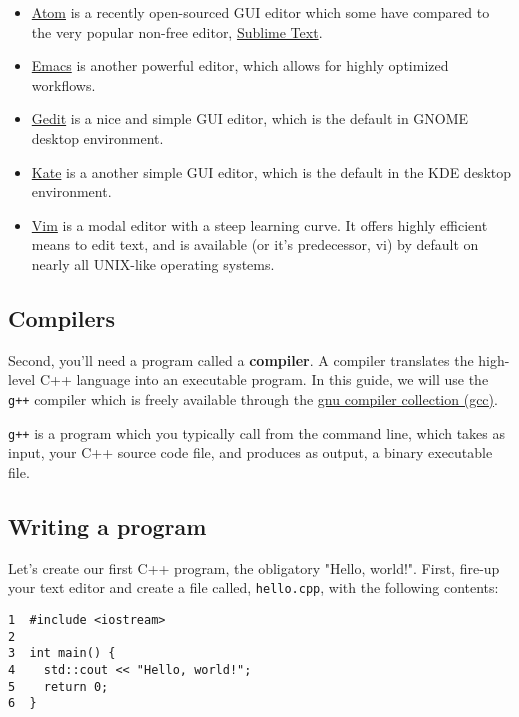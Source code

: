 \documentclass[11pt]{article}
\begin{document}
\begin{itemize}
\item \href{https://atom.io/}{Atom} is a recently open-sourced GUI editor which some have compared to the very popular non-free editor, \href{https://sublimetext.com}{Sublime Text}.
\item \href{https://www.gnu.org/software/emacs/}{Emacs} is another powerful editor, which allows for highly optimized workflows.
\item \href{https://wiki.gnome.org/Apps/Gedit}{Gedit} is a nice and simple GUI editor, which is the default in GNOME desktop environment.
\item \href{https://kate-editor.org}{Kate} is a another simple GUI editor, which is the default in the KDE desktop environment.
\item \href{http://www.vim.org}{Vim} is a modal editor with a steep learning curve. It offers highly efficient means to edit text, and is available (or it's predecessor, vi) by default on nearly all UNIX-like operating systems.
\end{itemize}

\subsection{Compilers}
\label{sec:orgheadline6}

Second, you'll need a program called a \textbf{compiler}. A compiler translates 
the high-level C++ language into an executable program. In this guide, we 
will use the \texttt{g++} compiler which is freely available through the 
\href{https://gcc.gnu.org/}{gnu compiler collection (gcc)}.

\texttt{g++} is a program which you typically call from the command line, which 
takes as input, your C++ source code file, and produces as output, a 
binary executable file.

\subsection{Writing a program}
\label{sec:orgheadline7}

Let's create our first C++ program, the obligatory "Hello, world!". First, 
fire-up your text editor and create a file called, \texttt{hello.cpp}, with the 
following contents:

\begin{verbatim}
1  #include <iostream>
2  
3  int main() {
4    std::cout << "Hello, world!";
5    return 0;
6  }
\end{verbatim}
\end{document}
